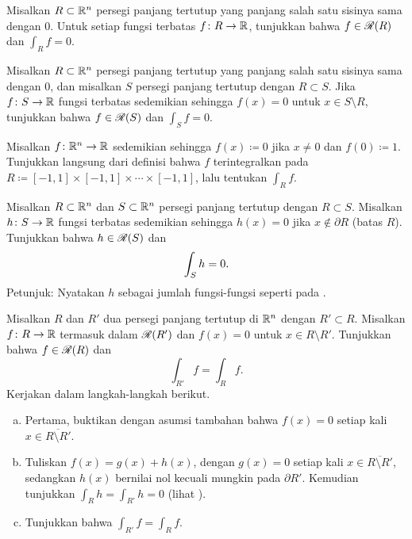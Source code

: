 \begin{exercise}
Misalkan $R \subset {\mathbb{R}}^n$ persegi panjang tertutup yang panjang salah satu
sisinya sama dengan 0. Untuk setiap fungsi terbatas $f \colon R \to {\mathbb{R}}$, tunjukkan
bahwa $f \in {\mathscr{R}}(R)$ dan $\int_R f = 0$.
\end{exercise}

\begin{exercise} \label{mv:zerosiderectangle}
Misalkan $R \subset {\mathbb{R}}^n$ persegi panjang tertutup yang panjang salah satu
sisinya sama dengan 0, dan misalkan $S$ persegi panjang tertutup dengan $R \subset S$.
Jika $f \colon S \to {\mathbb{R}}$ fungsi terbatas sedemikian sehingga $f(x) = 0$ untuk
$x \in S \setminus R$, tunjukkan bahwa $f \in {\mathscr{R}}(S)$ dan $\int_S f = 0$.
\end{exercise}

\begin{exercise}
Misalkan $f\colon {\mathbb{R}}^n \to {\mathbb{R}}$ sedemikian sehingga $f(x) \coloneqq 0$ jika
$x \neq 0$ dan $f(0) \coloneqq 1$. Tunjukkan langsung dari definisi bahwa $f$
terintegralkan pada
$R \coloneqq [-1,1] \times [-1,1] \times \cdots \times [-1,1]$, lalu tentukan
$\int_R f$.
\end{exercise}

\begin{exercise} \label{mv:zeroinside}
Misalkan $R \subset {\mathbb{R}}^n$ dan $S \subset {\mathbb{R}}^n$ persegi panjang tertutup dengan
$R \subset S$. Misalkan $h \colon S \to {\mathbb{R}}$ fungsi terbatas sedemikian sehingga
$h(x) = 0$ jika $x \notin \partial R$ (batas $R$). Tunjukkan bahwa
$h \in {\mathscr{R}}(S)$ dan
\begin{equation*}
\int_{S} h = 0 .
\avoidbreak
\end{equation*}
Petunjuk: Nyatakan $h$ sebagai jumlah fungsi-fungsi seperti pada
.
\end{exercise}

\begin{exercise} \label{mv:zerooutside}
Misalkan $R$ dan $R'$ dua persegi panjang tertutup di ${\mathbb{R}}^n$ dengan
$R' \subset R$. Misalkan $f \colon R \to {\mathbb{R}}$ termasuk dalam ${\mathscr{R}}(R')$ dan
$f(x) = 0$ untuk $x \in R \setminus R'$. Tunjukkan bahwa $f \in {\mathscr{R}}(R)$ dan
\begin{equation*}
\int_{R'} f = \int_R f .
\end{equation*}
Kerjakan dalam langkah-langkah berikut.
\begin{enumerate}[a)]
\item
Pertama, buktikan dengan asumsi tambahan bahwa $f(x) = 0$ setiap kali
$x \in \overline{R \setminus R'}$.
\item
Tuliskan $f(x) = g(x) + h(x)$, dengan $g(x) = 0$ setiap kali
$x \in \overline{R \setminus R'}$, sedangkan $h(x)$ bernilai nol kecuali
mungkin pada $\partial R'$. Kemudian tunjukkan
$\int_R h = \int_{R'} h = 0$ (lihat ).
\item
Tunjukkan bahwa $\int_{R'} f = \int_R f$.
\end{enumerate}
\end{exercise}


